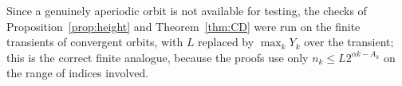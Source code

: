 \documentclass[11pt,reqno]{amsart}
\theoremstyle{plain}
\theoremstyle{definition}
\numberwithin{equation}{section}
\begin{document}
Since a genuinely aperiodic orbit is not available for testing, the checks of
Proposition~\ref{prop:height} and Theorem~\ref{thm:CD} were run on the finite
transients of convergent orbits, with $L$ replaced by $\max_kY_k$ over the
transient; this is the correct finite analogue, because the proofs use only
$n_k\le L2^{\alpha k-A_k}$ on the range of indices involved.

\printbibliography[title={References}]
\end{document}
